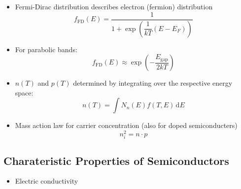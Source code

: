 \begin{itemize}
  \item Fermi-Dirac distribution describes electron (fermion) distribution
        \begin{equation*}
          f_{\mathrm{FD}}(E) = \dfrac{1}{1 + \exp \left(\dfrac{1}{kT} (E - E_{F})\right)}
        \end{equation*}
  \item For parabolic bands:
        \begin{equation*}
          f_{\mathrm{FD}}(E) \approx \exp \left(- \dfrac{E_{\mathrm{gap}}}{2 kT}\right)
        \end{equation*}
  \item $n(T)$ and $p(T)$ determined by integrating over the respective energy space:
        \begin{equation*}
        n(T) = \int N_{n}(E)f(T, E) \, \mathrm{d}E
        \end{equation*}
  \item Mass action law for carrier concentration (also for doped semiconducters)
        \begin{equation*}
          n_{i}^{2} = n \cdot p
        \end{equation*}
\end{itemize}

\subsection{Charateristic Properties of Semiconductors}
\begin{itemize}
        \item Electric conductivity
\end{itemize}
